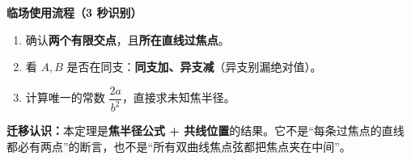 \begin{explanationbox}
  \medskip
  \textbf{\textcolor{CExplanation}{临场使用流程（3 秒识别）}}
  \begin{enumerate}[leftmargin=*,itemsep=0.35em,topsep=0.3em]
    \item 确认\textbf{两个有限交点}，且\textbf{所在直线过焦点}。
    \item 看 $A,B$ 是否在同支：\textbf{同支加、异支减}（异支别漏绝对值）。
    \item 计算唯一的常数 $\dfrac{2a}{b^2}$，直接求未知焦半径。
  \end{enumerate}

  \textbf{\textcolor{CExplanation}{迁移认识：}}本定理是\textbf{焦半径公式 + 共线位置}的结果。它不是“每条过焦点的直线都必有两点”的断言，也不是“所有双曲线焦点弦都把焦点夹在中间”。
\end{explanationbox}
